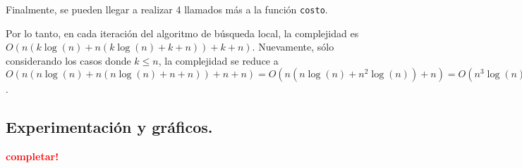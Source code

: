Finalmente, se pueden llegar a realizar 4 llamados más a la función
\texttt{costo}.

Por lo tanto, en cada iteración del algoritmo de búsqueda local, la complejidad
es $O(n (k\log(n) + n (k\log(n) + k + n)) + k + n)$. Nuevamente, sólo
considerando los casos donde $k \le n$, la complejidad se reduce a
$O(n(n\log(n) + n (n\log(n) + n + n)) + n + n) = O(n (n\log(n) + n^2 \log(n)) + n) = O(n^3 \log(n))$.



\newpage \subsection{Experimentación y gráficos.}
\vspace*{0.3cm}

\textcolor{red}{\textbf{completar!}}
